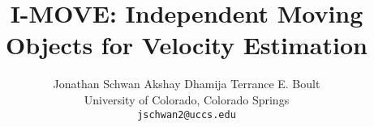 \documentclass[10pt,twocolumn,letterpaper]{article}
\begin{document}
\title{I-MOVE: Independent Moving Objects for Velocity Estimation}%

\author{Jonathan Schwan \hspace{2cm} Akshay Dhamija \hspace{2cm} Terrance E. Boult\\
University of Colorado, Colorado Springs\\
{\tt\small jschwan2@uccs.edu}
}

\maketitle
\ifwacvfinal\thispagestyle{empty}\fi

\maketitle







{\small


}
\end{document}
